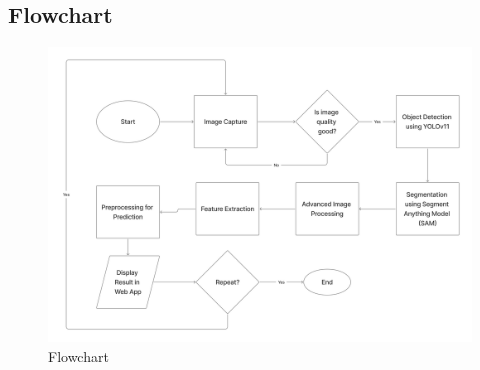 {\subsection {Flowchart}
\begin{figure}[h]
	\centering
	\includegraphics[height=0.45\textheight]{figures/Flowchart2Large}
	\caption{Flowchart}
	\label{fig:Flowchart}
\end{figure}

}
